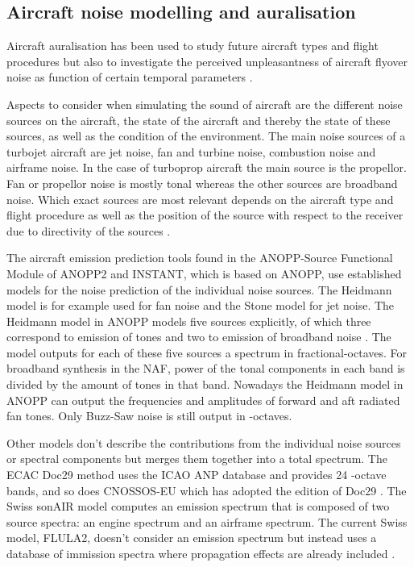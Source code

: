 \documentclass[10pt,twocolumn]{article}
\begin{document}
\subsection{Aircraft noise modelling and auralisation}
Aircraft auralisation has been used to study future aircraft types
\cite{Rizzi2013,Rizzi2016,Rizzi2016a} and flight procedures \cite{Sahai2016} but
also to investigate the perceived unpleasantness of aircraft flyover noise as
function of certain temporal parameters \cite{Pate2017}.

Aspects to consider when simulating the sound of aircraft are the different
noise sources on the aircraft, the state of the aircraft and thereby the state
of these sources, as well as the condition of the environment.
The main noise sources of a turbojet aircraft are jet noise, fan and turbine
noise, combustion noise and airframe noise. In the case of turboprop aircraft
the main source is the propellor\cite{Zaporozhets2011}. Fan or propellor noise
is mostly tonal whereas the other sources are broadband noise.
Which exact sources are most relevant depends on the aircraft type and flight
procedure as well as the position of the source with respect to the receiver due
to directivity of the sources \cite{Bertsch2015}.

The aircraft emission prediction tools found in the ANOPP-Source Functional
Module of ANOPP2 \cite{Lopes2016, Tuttle2017} and INSTANT\cite{Sahai2016b}, which is based
on ANOPP, use established models for the noise prediction of the individual
noise sources. The Heidmann model is for example used for fan noise and the
Stone model for jet noise. The Heidmann model in ANOPP models
five sources explicitly, of which three correspond to emission of tones and two
to emission of broadband noise \cite{Arntzen2014a}. The model outputs for each
of these five sources a spectrum in fractional-octaves.
For broadband synthesis in the NAF\cite{Aumann2015}, power of the tonal
components in each band is divided by the amount of tones in that band.
Nowadays the Heidmann model in ANOPP can output the frequencies and amplitudes
of forward and aft radiated fan tones. Only Buzz-Saw noise is still output in
-octaves.


Other models don't describe the contributions from the individual noise
sources or spectral components but merges them together into a total spectrum.
The ECAC Doc29 method \cite{Doc29_fourth_2016} uses the ICAO ANP database and
provides 24 -octave bands, and so does CNOSSOS-EU which has
adopted the  edition of Doc29 \cite{Doc29_third_2005}. The Swiss sonAIR
model \cite{Zellmann2016} computes an emission spectrum that is composed of two
source spectra: an engine spectrum and an airframe spectrum. The current Swiss
model, FLULA2, doesn't consider an emission spectrum but instead uses a database
of immission spectra where propagation effects are already included
\cite{EMPA2010,Schaffer2014}.
\end{document}

